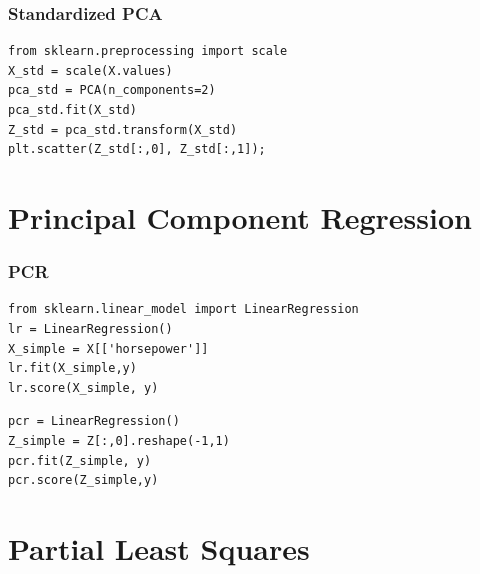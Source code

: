 \begin{frame}[fragile]\frametitle{Standardized PCA}
\tiny	
\begin{lstlisting}
from sklearn.preprocessing import scale
X_std = scale(X.values)
pca_std = PCA(n_components=2)
pca_std.fit(X_std)
Z_std = pca_std.transform(X_std)
plt.scatter(Z_std[:,0], Z_std[:,1]);
\end{lstlisting} 
\end{frame}


\section{Principal Component Regression}
\begin{frame}[fragile]\frametitle{PCR}
\tiny	
\begin{lstlisting}
from sklearn.linear_model import LinearRegression
lr = LinearRegression()
X_simple = X[['horsepower']]
lr.fit(X_simple,y)
lr.score(X_simple, y)
\end{lstlisting} 
\pause
\begin{lstlisting}
pcr = LinearRegression()
Z_simple = Z[:,0].reshape(-1,1)
pcr.fit(Z_simple, y)
pcr.score(Z_simple,y)
\end{lstlisting} 
\end{frame}

\section{Partial Least Squares}



